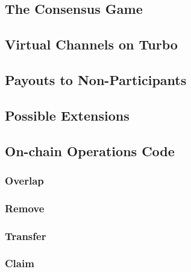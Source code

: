 \documentclass{article}
\begin{document}
\subsection{The Consensus Game}
\subsection{Virtual Channels on Turbo}
\subsection{Payouts to Non-Participants}
\subsection{Possible Extensions}

\subsection{On-chain Operations Code}
\subsubsection{Overlap}
\begin{minipage}{\linewidth} %
  
\end{minipage}

\subsubsection{Remove}
\begin{minipage}{\linewidth} %
  
\end{minipage}

\subsubsection{Transfer}
\begin{minipage}{\linewidth} %
  
\end{minipage}

\subsubsection{Claim}\label{appendix:claim}
\begin{minipage}{\linewidth} %
  
\end{minipage}
\end{document}
